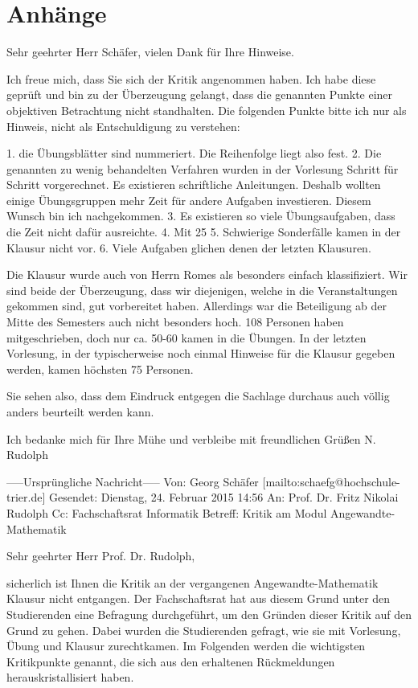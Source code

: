 \documentclass[a4paper, 11pt]{article} %
\begin{document}
\section{Anhänge}
\singlespacing
\begin{spverbatim}
Sehr geehrter Herr Schäfer,
vielen Dank für Ihre Hinweise.

Ich freue mich, dass Sie sich der Kritik angenommen haben.  Ich habe diese geprüft und bin zu der Überzeugung gelangt, dass die genannten  Punkte einer objektiven Betrachtung nicht standhalten. Die folgenden Punkte bitte ich nur als Hinweis, nicht als Entschuldigung zu verstehen:

	1. die Übungsblätter sind nummeriert. Die Reihenfolge liegt also fest.
	2. Die genannten zu wenig behandelten Verfahren wurden in der Vorlesung Schritt für Schritt vorgerechnet. Es existieren schriftliche Anleitungen. Deshalb wollten einige Übungsgruppen mehr Zeit für andere Aufgaben investieren. Diesem Wunsch bin ich nachgekommen.
	3. Es existieren so viele Übungsaufgaben, dass die Zeit nicht dafür ausreichte.
	4. Mit 25%
	5. Schwierige Sonderfälle kamen in der Klausur nicht vor. 
	6. Viele Aufgaben glichen denen der letzten Klausuren.

Die Klausur wurde auch von Herrn Romes als besonders einfach klassifiziert. Wir sind beide der Überzeugung, dass wir diejenigen, welche in die Veranstaltungen gekommen sind, gut vorbereitet haben. Allerdings war die Beteiligung ab der Mitte des Semesters auch nicht besonders hoch. 108 Personen haben mitgeschrieben, doch nur ca. 50-60 kamen in die Übungen. In der letzten Vorlesung, in der typischerweise noch einmal Hinweise für die Klausur gegeben werden, kamen höchsten 75 Personen.


Sie sehen also, dass dem Eindruck entgegen die Sachlage durchaus auch  völlig anders beurteilt werden kann.

Ich bedanke mich für Ihre Mühe und 
verbleibe mit freundlichen Grüßen 
N. Rudolph


-----Ursprüngliche Nachricht----- 
Von: Georg Schäfer [mailto:schaefg@hochschule-trier.de] 
Gesendet: Dienstag, 24. Februar 2015 14:56 
An: Prof. Dr. Fritz Nikolai Rudolph 
Cc: Fachschaftsrat Informatik 
Betreff: Kritik am Modul Angewandte-Mathematik 

Sehr geehrter Herr Prof. Dr. Rudolph, 


sicherlich ist Ihnen die Kritik an der vergangenen Angewandte-Mathematik  
Klausur nicht entgangen. Der Fachschaftsrat hat aus diesem Grund unter 
den Studierenden eine Befragung durchgeführt, um den Gründen dieser 
Kritik auf den Grund zu gehen. Dabei wurden die Studierenden gefragt, 
wie sie mit Vorlesung, Übung und Klausur zurechtkamen. Im Folgenden 
werden die wichtigsten Kritikpunkte genannt, die sich aus den erhaltenen 
Rückmeldungen herauskristallisiert haben. 


\end{spverbatim}
\end{document}
